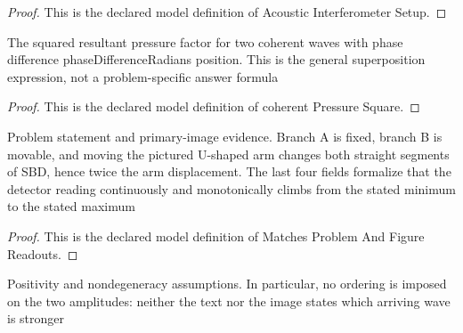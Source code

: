 \begin{proof}
  This is the declared model definition of Acoustic Interferometer Setup.
\end{proof}
\begin{definition}
  \label{def:physics:phyx-mini-0325:phyxminiproblems-problemphyxmini0325-coherentpressuresquare}
  The squared resultant pressure factor for two coherent waves with phase difference phaseDifferenceRadians position. This is the general superposition expression, not a problem-specific answer formula
\end{definition}
\begin{proof}
  This is the declared model definition of coherent Pressure Square.
\end{proof}
\begin{definition}
  \label{def:physics:phyx-mini-0325:phyxminiproblems-problemphyxmini0325-matchesproblemandfigurereadouts}
  Problem statement and primary-image evidence. Branch A is fixed, branch B is movable, and moving the pictured U-shaped arm changes both straight segments of SBD, hence twice the arm displacement. The last four fields formalize that the detector reading continuously and monotonically climbs from the stated minimum to the stated maximum
\end{definition}
\begin{proof}
  This is the declared model definition of Matches Problem And Figure Readouts.
\end{proof}
\begin{definition}
  \label{def:physics:phyx-mini-0325:phyxminiproblems-problemphyxmini0325-hasphysicalacousticparameters}
  Positivity and nondegeneracy assumptions. In particular, no ordering is imposed on the two amplitudes: neither the text nor the image states which arriving wave is stronger
\end{definition}
